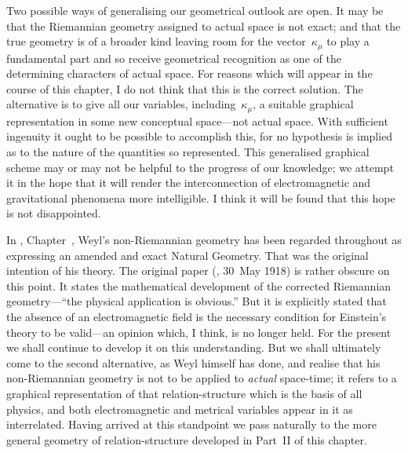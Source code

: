 \documentclass[12pt]{book}
\begin{document}
Two possible ways of generalising our geometrical outlook are open. It
may be that the Riemannian geometry assigned to actual space is not exact;
and that the true geometry is of a broader kind leaving room for the vector~$\kappa_{\mu}$
to play a fundamental part and so receive geometrical recognition as one
of the determining characters of actual space. For reasons which will appear
in the course of this chapter, I do not think that this is the correct solution.
The alternative is to give all our variables, including~$\kappa_{\mu}$, a suitable graphical
representation in some new conceptual space---not actual space. With sufficient
ingenuity it ought to be possible to accomplish this, for no hypothesis is implied
as to the nature of the quantities so represented. This generalised graphical
scheme may or may not be helpful to the progress of our knowledge; we
attempt it in the hope that it will render the interconnection of electromagnetic
and gravitational phenomena more intelligible. I think it will be found
that this hope is not disappointed.

In , Chapter~, Weyl's non-Riemannian
geometry has been regarded throughout as expressing an amended and
exact Natural Geometry. That was the original intention of his theory\footnotemark.\footnotetext
  {The original paper (, 30~May 1918) is rather obscure on this point.
  It states the mathematical development of the corrected Riemannian geometry---``the physical
  application is obvious.'' But it is explicitly stated that the absence of an electromagnetic field is
  the necessary condition for Einstein's theory to be valid---an opinion which, I think, is no longer
  held.}
For the present we shall continue to develop it on this understanding. But
we shall ultimately come to the second alternative, as Weyl himself has done,
and realise that his non-Riemannian geometry is not to be applied to \emph{actual}
%
space-time; it refers to a graphical representation of that relation-structure
which is the basis of all physics, and both electromagnetic and metrical
variables appear in it as interrelated. Having arrived at this standpoint we
pass naturally to the more general geometry of relation-structure developed
in Part~II of this chapter.%
%
\end{document}
